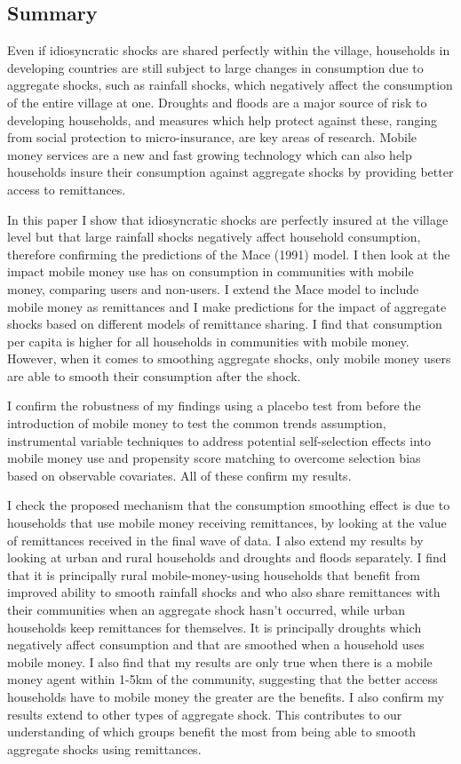 \subsection{Summary}
Even if idiosyncratic shocks are shared perfectly within the village, households in developing countries are still subject to large changes in consumption due to aggregate shocks, such as rainfall shocks, which negatively affect the consumption of the entire village at one. Droughts and floods are a major source of risk to developing households, and measures which help protect against these, ranging from social protection to micro-insurance, are key areas of research. Mobile money services are a new and fast growing technology which can also help households insure their consumption against aggregate shocks by providing better access to remittances.

In this paper I show that idiosyncratic shocks are perfectly insured at the village level but that large rainfall shocks negatively affect household consumption, therefore confirming the predictions of the Mace (1991) model. I then look at the impact mobile money use has on consumption in communities with mobile money, comparing users and non-users. I extend the Mace model to include mobile money as remittances and I make predictions for the impact of aggregate shocks based on different models of remittance sharing. I find that consumption per capita is higher for all households in communities with mobile money. However, when it comes to smoothing aggregate shocks, only mobile money users are  able to smooth their consumption after the shock. 

I confirm the robustness of my findings using a placebo test from before the introduction of mobile money to test the common trends assumption, instrumental variable techniques to address potential self-selection effects into mobile money use and propensity score matching to overcome selection bias based on observable covariates. All of these confirm my results. 

I check the proposed mechanism that the consumption smoothing effect is due to households that use mobile money receiving remittances, by looking at the value of remittances received in the final wave of data. I also extend my results by looking at urban and rural households and droughts and floods separately. I find that it is principally rural mobile-money-using households that benefit from improved ability to smooth rainfall shocks and who also share remittances with their communities when an aggregate shock hasn't occurred, while urban households keep remittances for themselves. It is principally droughts which negatively affect consumption and that are smoothed when a household uses mobile money. I also find that my results are only true when there is a mobile money agent within 1-5km of the community, suggesting that the better access households have to mobile money the greater are the benefits. I also confirm my results extend to other types of aggregate shock. This contributes to our understanding of which groups benefit the most from being able to smooth aggregate shocks using remittances.   

